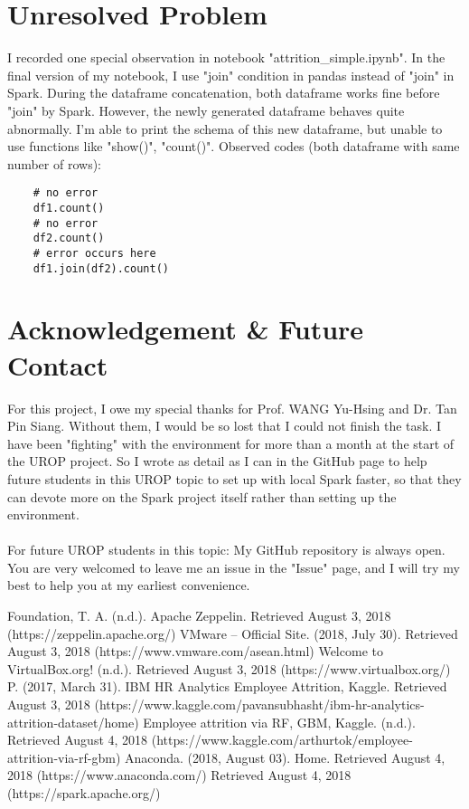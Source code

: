 \documentclass[a4paper, 12pt]{article}
\begin{document}
    \section*{Unresolved Problem}
    I recorded one special observation in notebook "attrition\_simple.ipynb". In the final version 
    of my notebook, I use "join" condition in pandas instead of "join" in Spark. During the dataframe 
    concatenation, both dataframe works fine before "join" by Spark. However, the newly generated dataframe 
    behaves quite abnormally. I'm able to print the schema of this new dataframe, but unable to use 
    functions like "show()", "count()". Observed codes (both dataframe with same number of rows):
    \begin{verbatim}
    # no error
    df1.count()
    # no error
    df2.count()
    # error occurs here
    df1.join(df2).count()
    \end{verbatim}
    
    \section*{Acknowledgement \& Future Contact}
    For this project, I owe my special thanks for Prof. WANG Yu-Hsing and Dr. Tan Pin Siang. Without 
    them, I would be so lost that I could not finish the task. I have been "fighting" with the 
    environment for more than a month at the start of the UROP project. So I wrote as detail as I 
    can in the GitHub page to help future students in this UROP topic to set up with local Spark 
    faster, so that they can devote more on the Spark project itself rather than setting up the 
    environment.\\
    \\
    For future UROP students in this topic: My GitHub repository is always open. You are very welcomed 
    to leave me an issue in the "Issue" page, and I will try my best to help you at my earliest convenience.

    \begin{thebibliography}{9}
     Foundation, T. A. (n.d.). Apache Zeppelin. Retrieved August 3, 2018 
    (https://zeppelin.apache.org/)
     VMware – Official Site. (2018, July 30). Retrieved August 3, 2018
    (https://www.vmware.com/asean.html)
     Welcome to VirtualBox.org! (n.d.). Retrieved August 3, 2018
    (https://www.virtualbox.org/)
     P. (2017, March 31). IBM HR Analytics Employee Attrition, Kaggle. Retrieved August 3, 2018
    (https://www.kaggle.com/pavansubhasht/ibm-hr-analytics-attrition-dataset/home)
     Employee attrition via RF, GBM, Kaggle. (n.d.). Retrieved August 4, 2018
    (https://www.kaggle.com/arthurtok/employee-attrition-via-rf-gbm)
     Anaconda. (2018, August 03). Home. Retrieved August 4, 2018
    (https://www.anaconda.com/)
     Retrieved August 4, 2018
    (https://spark.apache.org/)

    \end{thebibliography}
    
\end{document}
